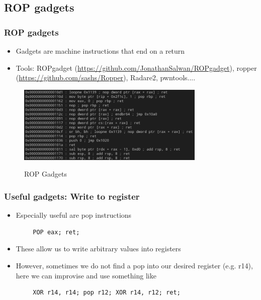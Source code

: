 \documentclass[11pt]{beamer}
\begin{document}
\subsection{ROP gadgets}
\begin{frame}
    \frametitle{ROP gadgets}
    \begin{itemize}
        \item Gadgets are machine instructions that end on a return
        \item Tools: ROPgadget (\url{https://github.com/JonathanSalwan/ROPgadget}), ropper (\url{https://github.com/sashs/Ropper}), Radare2, pwntools....
    \end{itemize}
    \begin{figure}[h]
        \caption{ROP Gadgets}
        \centering
        \includegraphics[width=0.8\textwidth]{gadget.png}\label{gadget}
    \end{figure}

\end{frame}

\begin{frame}[fragile]
    \frametitle{Useful gadgets: Write to register}
    \begin{itemize}
        \item Especially useful are pop instructions
    \end{itemize}
    \begin{Verbatim}
        POP eax; ret;
    \end{Verbatim}
    \begin{itemize}
        \item These allow us to write arbitrary values into registers
        \item However, sometimes we do not find a pop into our desired register (e.g. r14), here we can improvise and use something like
    \end{itemize}
    \begin{Verbatim}
        XOR r14, r14; pop r12; XOR r14, r12; ret;
    \end{Verbatim}
\end{frame}
\end{document}
